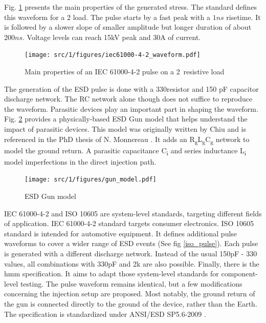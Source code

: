 Fig. \ref{iec_pulse} presents the main properties of the generated stress.
The standard defines this waveform for a 2\textOmega{} load.
The pulse starts by a fast peak with a $1ns$ risetime.
It is followed by a slower slope of smaller amplitude but longer duration of about $200ns$.
Voltage levels can reach 15kV peak and 30A of current.

\begin{figure}[!h]
  \centering
  \texttt{[image: src/1/figures/iec61000-4-2\_waveform.pdf]}
  \caption{Main properties of an IEC 61000-4-2 pulse on a 2\textOmega\ resistive load}
  \label{iec_pulse}
\end{figure}

The generation of the ESD pulse is done with a 330\textOmega resistor and 150 pF capacitor discharge network.
The RC network alone though does not suffice to reproduce the waveform.
Parasitic devices play an important part in shaping the waveform.
Fig. \ref{fig:esd-gun-model} provides a physically-based ESD Gun model that helps understand the impact of parasitic devices.
This model was originally written by Chiu \cite{phd-chiu} and is referenced in the PhD thesis of N. Monnereau \cite{phd-monnereau}.
It adds an R\textsubscript{g}L\textsubscript{g}C\textsubscript{g} network to model the ground return.
A parasitic capacitance C\textsubscript{i} and series inductance L\textsubscript{i} model imperfections in the direct injection path.

\begin{figure}[!h]
  \centering
  \texttt{[image: src/1/figures/gun\_model.pdf]}
  \caption{ESD Gun model}
  \label{fig:esd-gun-model}
\end{figure}

IEC 61000-4-2 \cite{iec61000-4-2} and ISO 10605 \cite{iso10605} are system-level standards, targeting different fields of application.
IEC 61000-4-2\cite{iec61000-4-2} standard targets consumer electronics.
ISO 10605\cite{iso10605} standard is intended for automotive equipment.
It defines additional pulse waveforms to cover a wider range of ESD events (See fig \ref{iso_pulse}).
Each pulse is generated with a different discharge network.
Instead of the usual 150pF - 330\textOmega{} values, all combinations with 330pF and 2k\textOmega{} are also possible.
Finally, there is the \gls{hmm} \cite{hmm} specification.
It aims to adapt those system-level standards for component-level testing.
The pulse waveform remains identical, but a few modifications concerning the injection setup are proposed.
Most notably, the ground return of the gun is connected directly to the ground of the device, rather than the Earth.
The specification is standardized under ANSI/ESD SP5.6-2009 \cite{hmm}.

